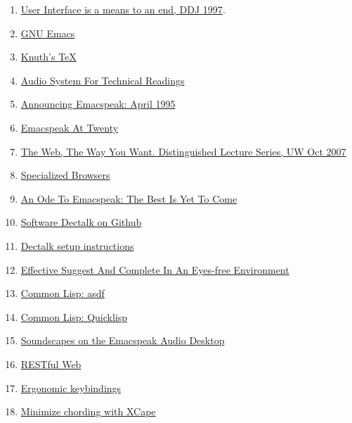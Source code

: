 \documentclass[11pt]{article}
\begin{document}
\begin{enumerate}
\item \href{https://www.drdobbs.com:443/user-interface-a-means-to-an-end/184410453}{User Interface is a means to an end, DDJ 1997}.
\item \href{https://www.gnu.org/s/emacs/}{GNU Emacs}
\item \href{https://en.wikipedia.org/wiki/TeX}{Knuth's \TeX{}}
\item \href{https://emacspeak.blogspot.com/2022/12/aster-spoken-math-on-emacspeak-audio\_21.html}{Audio System For Technical Readings}
\item \href{https://tvraman.github.io/emacspeak//web/releases/release-3.0.html}{Announcing Emacspeak: April 1995}
\item \href{https://emacspeak.sourceforge.net/turning-twenty.html}{Emacspeak At Twenty}
\item \href{http://www.cs.washington.edu/htbin-post/mvis/mvis?ID=636}{The Web, The Way You Want.  Distinguished Lecture Series, UW Oct 2007}
\item \href{https://emacspeak.sourceforge.net/raman/publications/specialized-browsers/}{Specialized Browsers}
\item \href{https://tvraman.github.io/emacspeak/web/01-gemini.ogg}{An Ode To Emacspeak: The Best Is Yet To Come}
\item \href{https://github.com/dectalk/dectalk.git}{Software Dectalk on Github}
\item \href{https://raw.githubusercontent.com/tvraman/emacspeak/master/servers/software-dtk/Readme.org}{Dectalk  setup instructions}
\item \href{https://emacspeak.blogspot.com/2018/06/effective-suggest-and-complete-in-eyes.html}{Effective Suggest And Complete In An Eyes-free Environment}
\item \href{https://asdf.common-lisp.dev/asdf.html}{Common Lisp: asdf}
\item \href{https://www.quicklisp.org/}{Common Lisp: Quicklisp}
\item \href{https://emacspeak.blogspot.com/2015/12/soundscapes-on-emacspeak-audio-desktop.html}{Soundscapes on the Emacspeak Audio Desktop}
\item \href{https://en.wikipedia.org/wiki/REST}{RESTful Web}
\item \href{https://emacspeak.blogspot.com/2023/09/emacs-ergonomics-dont-punish-your.html}{Ergonomic keybindings}
\item \href{https://github.com/alols/xcape}{Minimize chording with XCape}

\end{enumerate}
\end{document}
